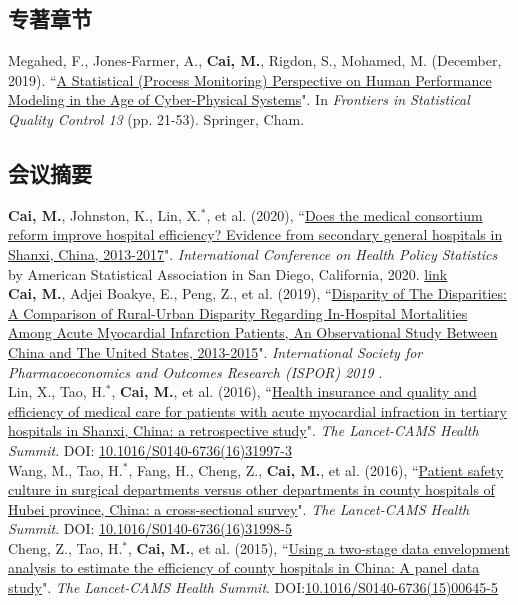 \documentclass[11pt, a4paper]{article}
\newcommand{\years}[1]{\marginnote{\scriptsize #1}}
\begin{document}
\subsection*{专著章节}
\years{2019}Megahed, F., Jones-Farmer, A., \textbf{Cai, M.}, Rigdon, S., Mohamed, M. (December, 2019). ``\ul{A Statistical (Process Monitoring) Perspective on Human Performance Modeling in the Age of Cyber-Physical Systems}". In \textit{Frontiers in Statistical Quality Control 13} (pp. 21-53). Springer, Cham.

\subsection*{会议摘要}
\noindent
\years{2020}\textbf{Cai, M.}, Johnston, K., Lin, X.$^\ast$, et al. (2020), ``\ul{Does the medical consortium reform improve hospital efficiency? Evidence from secondary general hospitals in Shanxi, China, 2013-2017}". \emph{International Conference on Health Policy Statistics} by American Statistical Association in San Diego, California, 2020. \href{https://ww2.amstat.org/meetings/ichps/2020/onlineprogram/AbstractDetails.cfm?AbstractID=306703}{link}\\[6pt]
\years{2019}\textbf{Cai, M.}, Adjei Boakye, E., Peng, Z., et al. (2019), ``\ul{Disparity of The Disparities: A Comparison of Rural-Urban Disparity Regarding In-Hospital Mortalities Among Acute Myocardial Infarction Patients, An Observational Study Between China and The United States, 2013-2015}". \emph{International Society for Pharmacoeconomics and Outcomes Research (ISPOR) 2019 }. \\[6pt]
\years{2016}Lin, X., Tao, H.$^\ast$, \textbf{Cai, M.}, et al. (2016), ``\ul{Health insurance and quality and efficiency of medical care for patients with acute myocardial infraction in tertiary hospitals in Shanxi, China: a retrospective study}". \emph{The Lancet-CAMS Health Summit}. DOI: \href{https://doi.org/10.1016/S0140-6736(16)31997-3}{10.1016/S0140-6736(16)31997-3}\\[6pt]
\years{2016}Wang, M., Tao, H.$^\ast$, Fang, H., Cheng, Z., \textbf{Cai, M.}, et al. (2016), ``\ul{Patient safety culture in surgical departments versus other departments in county hospitals of Hubei province, China: a cross-sectional survey}". \emph{The Lancet-CAMS Health Summit}. DOI: \href{https://doi.org/10.1016/S0140-6736(16)31998-5}{10.1016/S0140-6736(16)31998-5}\\[6pt]
\years{2015}Cheng, Z., Tao, H.$^\ast$, \textbf{Cai, M.}, et al.  (2015), ``\ul{Using a two-stage data envelopment analysis to estimate the efficiency of county hospitals in China: A panel data study}". \emph{The Lancet-CAMS Health Summit}. DOI:\href{https://doi.org/10.1016/S0140-6736(15)00645-5}{10.1016/S0140-6736(15)00645-5} 
\end{document}
